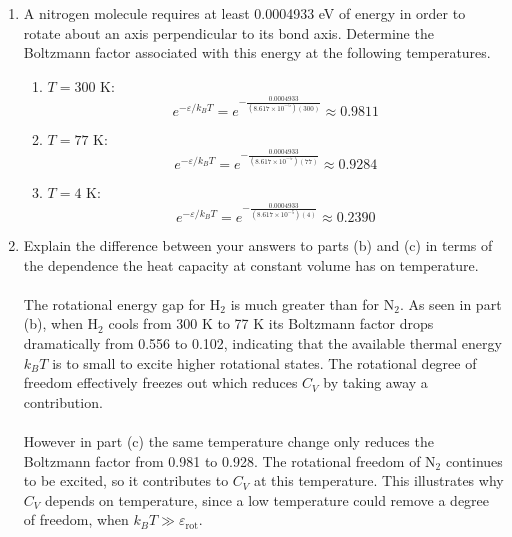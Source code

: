 \documentclass{article}
\begin{document}
\begin{enumerate}
\begin{enumerate}
            \item A nitrogen molecule requires at least 0.0004933 eV of energy in order to rotate about an axis perpendicular to its bond axis. Determine the Boltzmann factor associated with this energy at the following temperatures.
            \\
            \begin{enumerate}
                \item $T = 300$ K:
                \[e^{-\varepsilon/k_BT} = e^{-\frac{0.0004933}{(8.617\times10^{-5})(300)}} \approx \boxed{0.9811}\]
                \item $T = 77$ K:
                \[e^{-\varepsilon/k_BT} = e^{-\frac{0.0004933}{(8.617\times10^{-5})(77)}} \approx \boxed{0.9284}\]
                \item $T = 4$ K:
                \[e^{-\varepsilon/k_BT} = e^{-\frac{0.0004933}{(8.617\times10^{-5})(4)}} \approx \boxed{0.2390}\]
            \end{enumerate}

            \item Explain the difference between your answers to parts (b) and (c) in terms of the dependence the heat capacity at constant volume has on temperature.
            \\
            \\The rotational energy gap for H$_2$ is much greater than for N$_2$. As seen in part (b), when H$_2$ cools from 300 K to 77 K its Boltzmann factor drops dramatically from 0.556 to 0.102, indicating that the available thermal energy $k_BT$ is to small to excite higher rotational states. The rotational degree of freedom effectively freezes out which reduces $C_V$ by taking away a contribution.
            \\
            \\However in part (c) the same temperature change only reduces the Boltzmann factor from 0.981 to 0.928. The rotational freedom of N$_2$ continues to be excited, so it contributes to $C_V$ at this temperature. This illustrates why $C_V$ depends on temperature, since a low temperature could remove a degree of freedom, when $k_BT \gg \varepsilon_{\text{rot}}$.


\end{enumerate}
\end{enumerate}
\end{document}
